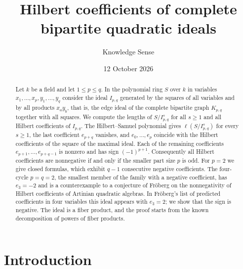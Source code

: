 \documentclass{amsart}
\theoremstyle{definition}
\theoremstyle{remark}
\numberwithin{equation}{section}
\begin{document}
\title[Complete bipartite quadratic ideals]{Hilbert coefficients of complete bipartite quadratic ideals}

\author{Knowledge Sense}
\address{Knowledge Sense}

\date{12 October 2026}



\begin{abstract}
Let $k$ be a field and let $1\le p\le q$. In the polynomial ring $S$ over $k$
in variables $x_1,\dots,x_p,y_1,\dots,y_q$ consider the ideal $I_{p,q}$
generated by the squares of all variables and by all products $x_ay_b$, that
is, the edge ideal of the complete bipartite graph $K_{p,q}$ together with all
squares. We compute the lengths of $S/I_{p,q}^s$ for all $s\ge1$ and all
Hilbert coefficients of $I_{p,q}$. The Hilbert--Samuel polynomial gives
$\ell(S/I_{p,q}^s)$ for every $s\ge1$, the last coefficient $e_{p+q}$
vanishes, and $e_0,\dots,e_p$ coincide with the Hilbert coefficients of the
square of the maximal ideal. Each of the remaining coefficients
$e_{p+1},\dots,e_{p+q-1}$ is nonzero and has sign $(-1)^{p+1}$. Consequently
all Hilbert coefficients are nonnegative if and only if the smaller part size
$p$ is odd. For $p=2$ we give closed formulas, which exhibit $q-1$ consecutive
negative coefficients. The four-cycle $p=q=2$, the smallest member of the
family with a negative coefficient, has $e_3=-2$ and is a counterexample to a
conjecture of Fr\"oberg on the nonnegativity of Hilbert coefficients of
Artinian quadratic algebras. In Fr\"oberg's list of predicted coefficients in
four variables this ideal appears with $e_3=2$; we show that the sign is
negative. The ideal is a fiber product, and the proof starts from the known
decomposition of powers of fiber products.
\end{abstract}

\maketitle

\section{Introduction}
\end{document}
